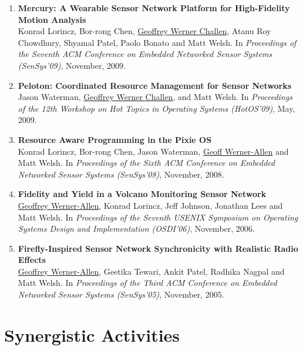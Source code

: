 \begin{enumerate}

\item \textbf{Mercury: A Wearable Sensor Network Platform for High-Fidelity
Motion Analysis}\\ Konrad Lorincz, Bor-rong Chen, \uline{Geoffrey Werner
Challen}, Atanu Roy Chowdhury, Shyamal Patel, Paolo Bonato and Matt Welsh. In
\emph{Proceedings of the Seventh ACM Conference on Embedded Networked Sensor
Systems (SenSys'09)}, November, 2009.
\nocite{mercury-sensys09}

\item \textbf{Peloton: Coordinated Resource Management for Sensor Networks}\\
Jason Waterman, \uline{Geoffrey Werner Challen}, and Matt Welsh. In
\emph{Proceedings of the 12th Workshop on Hot Topics in Operating Systems
(HotOS'09)}, May, 2009.
\nocite{peloton-hotos09}

\item \textbf{Resource Aware Programming in the Pixie OS}\\ Konrad Lorincz,
Bor-rong Chen, Jason Waterman, \uline{Geoff Werner-Allen} and Matt Welsh. In
\emph{Proceedings of the Sixth ACM Conference on Embedded Networked Sensor
Systems (SenSys'08)}, November, 2008.
\nocite{pixie-sensys08}

\item \textbf{Fidelity and Yield in a Volcano Monitoring Sensor Network}\\
\uline{Geoffrey Werner-Allen}, Konrad Lorincz, Jeff Johnson, Jonathan Lees and
Matt Welsh. In \emph{Proceedings of the Seventh USENIX Symposium on Operating
Systems Design and Implementation (OSDI'06)}, November, 2006.
\nocite{volcano-osdi06}

\item \textbf{Firefly-Inspired Sensor Network Synchronicity with Realistic
Radio Effects}\\ \uline{Geoffrey Werner-Allen}, Geetika Tewari, Ankit Patel,
Radhika Nagpal and Matt Welsh. In \emph{Proceedings of the Third ACM
Conference on Embedded Networked Sensor Systems (SenSys'05)}, November, 2005.
\nocite{firefly-sensys05}

\end{enumerate}

\section{Synergistic Activities}

